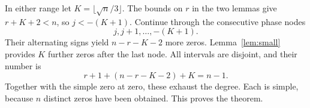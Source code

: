 \documentclass[11pt]{amsart}
\theoremstyle{definition}
\begin{document}
In either range let $K=\lfloor\sqrt n/3\rfloor$. The bounds on $r$ in the two lemmas give $r+K+2<n$, so $j<-(K+1)$. Continue through the consecutive phase nodes
\[
j,j+1,\ldots,-(K+1).
\]
Their alternating signs yield $n-r-K-2$ more zeros. Lemma~\ref{lem:small} provides $K$ further zeros after the last node. All intervals are disjoint, and their number is
\[
r+1+(n-r-K-2)+K=n-1.
\]
Together with the simple zero at zero, these exhaust the degree. Each is simple, because $n$ distinct zeros have been obtained. This proves the theorem.

\appendix



\end{document}
